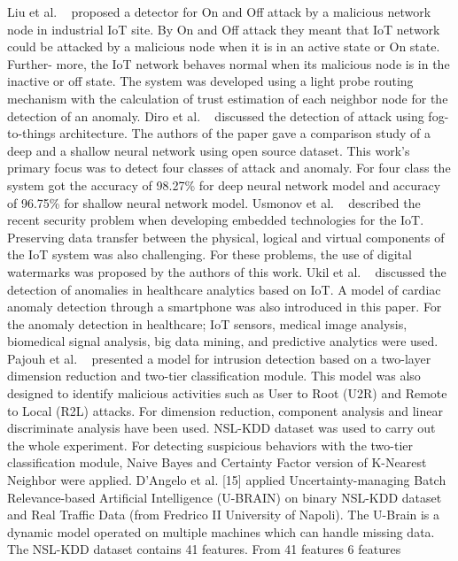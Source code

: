 Liu et al. ~\cite{LiuLLY18} proposed a detector for On and Off attack by a malicious network node in industrial IoT site. 
By On and Off attack they meant that IoT network could be attacked by a malicious node when it is in an active state or On state. 
Further- more, the IoT network behaves normal when its malicious node is in the inactive or off state. 
The system was developed using a light probe routing mechanism with the calculation of trust estimation of each neighbor node for the detection of an anomaly. 
Diro et al. ~\cite{DIRO2018761} discussed the detection of attack using fog-to-things architecture. 
The authors of the paper gave a comparison study of a deep and a shallow neural network using open source dataset. 
This work’s primary focus was to detect four classes of attack and anomaly. 
For four class the system got the accuracy of 98.27\% for deep neural network model and accuracy of 96.75\% for shallow neural network model. 
Usmonov et al. ~\cite{Usmonov8188589} described the recent security problem when developing embedded technologies for the IoT. 
Preserving data transfer between the physical, logical and virtual components of the IoT system was also challenging. 
For these problems, the use of digital watermarks was proposed by the authors of this work. 
Ukil et al. ~\cite{Ukil7474197} discussed the detection of anomalies in healthcare analytics based on IoT. 
A model of cardiac anomaly detection through a smartphone was also introduced in this paper. 
For the anomaly detection in healthcare; IoT sensors, medical image analysis, biomedical signal analysis, big data mining, and predictive analytics were used. 
Pajouh et al. ~\cite{Pajouh7762123} presented a model for intrusion detection based on a two-layer dimension reduction and two-tier classification module. 
This model was also designed to identify malicious activities such as User to Root (U2R) and Remote to Local (R2L) attacks. For dimension reduction, 
component analysis and linear discriminate analysis have been used. NSL-KDD dataset was used to carry out the whole experiment. 
For detecting suspicious behaviors with the two-tier classification module, Naive Bayes and Certainty Factor version of K-Nearest Neighbor were applied. 
D’Angelo et al. [15] applied Uncertainty-managing Batch Relevance-based Artificial Intelligence (U-BRAIN) on binary NSL-KDD dataset and 
Real Traffic Data (from Fredrico II University of Napoli). The U-Brain is a dynamic model operated on multiple machines which can handle missing data. 
The NSL-KDD dataset contains 41 features. From 41 features 6 features



